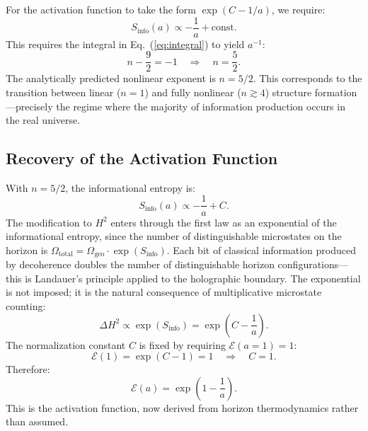 \documentclass[twocolumn,a4paper,aps,prd,twocolumn,showpacs,notitlepage,superscriptaddress,nofootinbib]{article}
\begin{document}
For the activation function to take the form
$\exp(C - 1/a)$, we require:
\begin{equation}
S_\mathrm{info}(a) \propto -\frac{1}{a} + \text{const}.
\end{equation}
This requires the integral in Eq.~(\ref{eq:integral}) to yield $a^{-1}$:
\begin{equation}
n - \frac{9}{2} = -1 \quad\Longrightarrow\quad \boxed{n = \frac{5}{2}}.
\label{eq:critical_n}
\end{equation}
The analytically predicted nonlinear exponent is $n = 5/2$.  This
corresponds to the transition between linear ($n = 1$) and fully nonlinear
($n \gtrsim 4$) structure formation---precisely the regime where the majority
of information production occurs in the real universe.

\subsection{Recovery of the Activation Function}

With $n = 5/2$, the informational entropy is:
\begin{equation}
S_\mathrm{info}(a) \propto -\frac{1}{a} + C.
\end{equation}
The modification to $H^2$ enters through the first law as an exponential
of the informational entropy, since the number of distinguishable
microstates on the horizon is $\Omega_\mathrm{total}
= \Omega_\mathrm{geo}\cdot\exp(S_\mathrm{info})$.
Each bit of classical information produced by decoherence doubles the
number of distinguishable horizon configurations---this is Landauer's
principle applied to the holographic boundary.  The exponential is not
imposed; it is the natural consequence of multiplicative microstate counting:
\begin{equation}
\Delta H^2 \propto \exp(S_\mathrm{info}) = \exp\!\left(C - \frac{1}{a}\right).
\end{equation}
The normalization constant $C$ is fixed by requiring
$\mathcal{E}(a{=}1) = 1$:
\begin{equation}
\mathcal{E}(1) = \exp(C - 1) = 1 \quad\Longrightarrow\quad C = 1.
\end{equation}
Therefore:
\begin{equation}
\boxed{\mathcal{E}(a) = \exp\!\left(1 - \frac{1}{a}\right)}.
\label{eq:activation}
\end{equation}
This is the activation function, now derived from horizon thermodynamics
rather than assumed.
\end{document}
